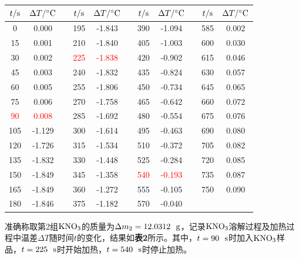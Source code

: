 \documentclass[12pt]{article}
\begin{document}
\begin{table}[h]
	\centering
	\begin{tabular}{ccccccccccc}
		\toprule
		$t/{\rm s}$ & $\Delta T/{\rm ^{\circ}C}$ & & $t/{\rm s}$ & $\Delta T/{\rm ^{\circ}C}$& & 	$t/{\rm s}$ & $\Delta T/{\rm ^{\circ}C}$ & & $t/{\rm s}$ & $\Delta T/{\rm ^{\circ}C}$ \\
		\midrule
		0   & 0.000  &  & 195 & -1.843 &  & 390 & -1.094 &  & 585 & 0.002 \\
		15  & 0.001  &  & 210 & -1.840 &  & 405 & -1.003 &  & 600 & 0.030 \\
		30  & 0.002  &  & \textcolor{red}{225} & \textcolor{red}{-1.838} &  & 420 & -0.902 &  & 615 & 0.046 \\
		45  & 0.003  &  & 240 & -1.832 &  & 435 & -0.824 &  & 630 & 0.057 \\
		60  & 0.005  &  & 255 & -1.806 &  & 450 & -0.734 &  & 645 & 0.065 \\
		75  & 0.006  &  & 270 & -1.758 &  & 465 & -0.642 &  & 660 & 0.072 \\
		\textcolor{red}{90}  & \textcolor{red}{0.008}  &  & 285 & -1.692 &  & 480 & -0.554 &  & 675 & 0.076 \\
		105 & -1.129 &  & 300 & -1.614 &  & 495 & -0.463 &  & 690 & 0.080 \\
		120 & -1.726 &  & 315 & -1.534 &  & 510 & -0.372 &  & 705 & 0.082 \\
		135 & -1.832 &  & 330 & -1.448 &  & 525 & -0.284 &  & 720 & 0.085 \\
		150 & -1.849 &  & 345 & -1.358 &  & \textcolor{red}{540} & \textcolor{red}{-0.193} &  & 735 & 0.087 \\
		165 & -1.849 &  & 360 & -1.272 &  & 555 & -0.105 &  & 750 & 0.090 \\
		180 & -1.846 &  & 375 & -1.182 &  & 570 & -0.040 &  &     &  	  \\
		\bottomrule
	\end{tabular}
\end{table}
\par

准确称取第2组$\rm KNO_{3}$的质量为$\Delta m_{2}=12.0312\ \ {\rm g}$，记录$\rm KNO_{3}$溶解过程及加热过程中温差$\Delta T$随时间$t$的变化，结果如\textbf{表2}所示。其中，$t=90\ \ {\rm s}$时加入$\rm KNO_{3}$样品，$t=225\ \ {\rm s}$时开始加热，$t=540\ \ {\rm s}$时停止加热。\par
\end{document}
